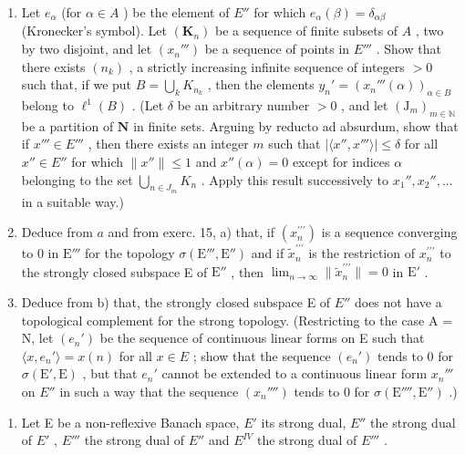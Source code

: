 \begin{enumerate}
\def\labelenumi{\alph{enumi})}
\item
  Let \(e_{\alpha}\) (for \(\alpha \in A\) ) be the element of \(E''\) for which \(e_{\alpha}(\beta) = \delta_{\alpha \beta}\) (Kronecker's symbol). Let \((\mathbf{K}_n)\) be a sequence of finite subsets of \(A\) , two by two disjoint, and let \((x_n''')\) be a sequence of points in \(E'''\) . Show that there exists \((n_k)\) , a strictly increasing infinite sequence of integers \(>0\) such that, if we put \(B = \bigcup_k K_{n_k}\) , then the elements \(y_n' = (x_n'''(\alpha))_{\alpha \in B}\) belong to \(\ell^1(B)\) . (Let \(\delta\) be an arbitrary number \(>0\) , and let \((\mathrm{J}_m)_{m \in \mathbb{N}}\) be a partition of \(\mathbf{N}\) in finite sets. Arguing by reducto ad absurdum, show that if \(x''' \in E'''\) , then there exists an integer \(m\) such that \(|\langle x'', x''' \rangle| \leqslant \delta\) for all \(x'' \in E''\) for which \(\| x'' \| \leqslant 1\) and \(x''(\alpha) = 0\) except for indices \(\alpha\) belonging to the set \(\bigcup_{n \in J_m} K_n\) . Apply this result successively to \(x_1'', x_2'', ...\) in a suitable way.)
\item
  Deduce from \(a\) and from exerc. 15, a) that, if \((x_{n}^{\prime \prime \prime})\) is a sequence converging to 0 in \(\mathrm{E}'''\) for the topology \(\sigma (\mathrm{E}''',\mathrm{E}'')\) and if \(\tilde{x}_n^{\prime \prime \prime}\) is the restriction of \(x_{n}^{\prime \prime \prime}\) to the strongly closed subspace E of \(\mathrm{E}''\) , then \(\lim_{n\to \infty}\| \tilde{x}_n^{\prime \prime \prime}\| = 0\) in \(\mathrm{E}'\) .
\item
  Deduce from b) that, the strongly closed subspace E of \(E''\) does not have a topological complement for the strong topology. (Restricting to the case A = N, let \((e_{n}')\) be the sequence of continuous linear forms on E such that \(\langle x, e_{n}' \rangle = x(n)\) for all \(x \in E\) ; show that the sequence \((e_{n}')\) tends to 0 for \(\sigma(\mathrm{E}', \mathrm{E})\) , but that \(e_{n}'\) cannot be extended to a continuous linear form \(x_{n}'''\) on \(E''\) in such a way that the sequence \((x_{n}'''')\) tends to 0 for \(\sigma(\mathrm{E}'''', \mathrm{E}'')\) .)
\end{enumerate}

\begin{enumerate}
\def\labelenumi{\arabic{enumi})}
\setcounter{enumi}{16}
\tightlist
\item
  Let E be a non-reflexive Banach space, \(E'\) its strong dual, \(E''\) the strong dual of \(E'\) , \(E'''\) the strong dual of \(E''\) and \(E^{IV}\) the strong dual of \(E'''\) .
\end{enumerate}

